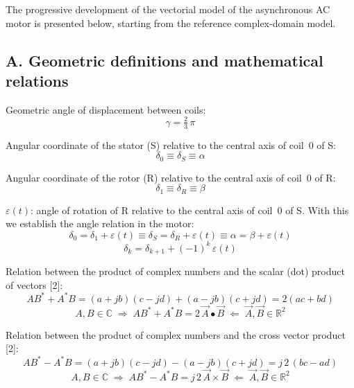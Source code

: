 \documentclass[11pt,a4paper]{article}
\begin{document}
The progressive development of the vectorial model of the asynchronous AC motor is presented below, starting from the reference complex-domain model.

\subsection*{A. Geometric definitions and mathematical relations}

Geometric angle of displacement between coils:
\begin{equation}\tag{1}\label{eq:1}
\gamma = \tfrac{2}{3}\,\pi
\end{equation}

Angular coordinate of the stator (S) relative to the central axis of coil~0 of S:
\begin{equation}\tag{2}\label{eq:2}
\delta_0 \equiv \delta_S \equiv \alpha
\end{equation}

Angular coordinate of the rotor (R) relative to the central axis of coil~0 of R:
\begin{equation}\tag{3}\label{eq:3}
\delta_1 \equiv \delta_R \equiv \beta
\end{equation}

$\varepsilon(t)$: angle of rotation of R relative to the central axis of coil~0 of S. With this we establish the angle relation in the motor:
\begin{equation}\tag{4}\label{eq:4}
\delta_0 = \delta_1 + \varepsilon(t) \equiv \delta_S = \delta_R + \varepsilon(t) \equiv \alpha = \beta + \varepsilon(t)
\end{equation}
\begin{equation}\tag{5}\label{eq:5}
\delta_k = \delta_{k+1} + (-1)^k\,\varepsilon(t)
\end{equation}

Relation between the product of complex numbers and the scalar (dot) product of vectors [2]:
\begin{equation}\tag{6}\label{eq:6}
AB^{*} + A^{*}B = (a+jb)(c-jd) + (a-jb)(c+jd) = 2(ac+bd)
\end{equation}
\begin{equation}\tag{7}\label{eq:7}
A,B\in\mathbb{C}\;\Rightarrow\; AB^{*}+A^{*}B = 2\,\vec A\bullet\vec B\;\Leftarrow\;\vec A,\vec B\in\mathbb{R}^{2}
\end{equation}

Relation between the product of complex numbers and the cross vector product [2]:
\begin{equation}\tag{8}\label{eq:8}
AB^{*} - A^{*}B = (a+jb)(c-jd) - (a-jb)(c+jd) = j\,2\,(bc-ad)
\end{equation}
\begin{equation}\tag{9}\label{eq:9}
A,B\in\mathbb{C}\;\Rightarrow\; AB^{*}-A^{*}B = j\,2\,\vec A\times\vec B\;\Leftarrow\;\vec A,\vec B\in\mathbb{R}^{2}
\end{equation}
\end{document}
